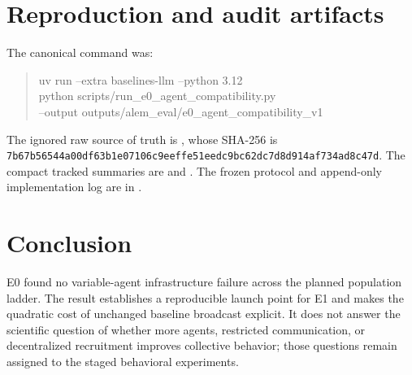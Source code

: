 \documentclass[11pt]{article}
\newcommand{\code}[1]{\texttt{#1}}
\begin{document}
\section{Reproduction and audit artifacts}

The canonical command was:

\begin{quote}
\small\ttfamily
uv run --extra baselines-llm --python 3.12\\
\hspace*{1em}python scripts/run\_e0\_agent\_compatibility.py\\
\hspace*{1em}--output outputs/alem\_eval/e0\_agent\_compatibility\_v1
\end{quote}

The ignored raw source of truth is
, whose
SHA-256 is
\code{7b67b56544a00df63b1e07106c9eeffe51eedc9bc62dc7d8d914af734ad8c47d}.
The compact tracked summaries are
 and
.  The frozen protocol and
append-only implementation log are in
.

\section{Conclusion}

E0 found no variable-agent infrastructure failure across the planned population
ladder.  The result establishes a reproducible launch point for E1 and makes the
quadratic cost of unchanged baseline broadcast explicit.  It does not answer the
scientific question of whether more agents, restricted communication, or
decentralized recruitment improves collective behavior; those questions remain
assigned to the staged behavioral experiments.
\end{document}
